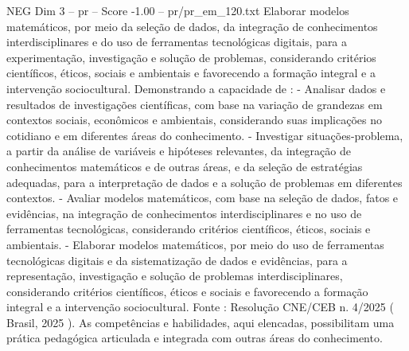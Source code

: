 \begin{textsample}{NEG Dim 3 – pr – Score -1.00 – pr/pr\_em\_120.txt}
Elaborar modelos matemáticos, por meio da seleção de dados, da integração de conhecimentos interdisciplinares e do uso de ferramentas tecnológicas digitais, para a experimentação, investigação e solução de problemas, considerando critérios científicos, éticos, sociais e ambientais e favorecendo a formação integral e a intervenção sociocultural.
Demonstrando a capacidade de : - Analisar dados e resultados de investigações científicas, com base na variação de grandezas em contextos sociais, econômicos e ambientais, considerando suas implicações no cotidiano e em diferentes áreas do conhecimento. - Investigar situações-problema, a partir da análise de variáveis e hipóteses relevantes, da integração de conhecimentos matemáticos e de outras áreas, e da seleção de estratégias adequadas, para a interpretação de dados e a solução de problemas em diferentes contextos. - Avaliar modelos matemáticos, com base na seleção de dados, fatos e evidências, na integração de conhecimentos interdisciplinares e no uso de ferramentas tecnológicas, considerando critérios científicos, éticos, sociais e ambientais. - Elaborar modelos matemáticos, por meio do uso de ferramentas tecnológicas digitais e da sistematização de dados e evidências, para a representação, investigação e solução de problemas interdisciplinares, considerando critérios científicos, éticos e sociais e favorecendo a formação integral e a intervenção sociocultural.
Fonte : Resolução CNE/CEB n. 4/2025 ( Brasil, 2025 ).
As competências e habilidades, aqui elencadas, possibilitam uma prática pedagógica articulada e integrada com outras áreas do conhecimento.

\end{textsample}
